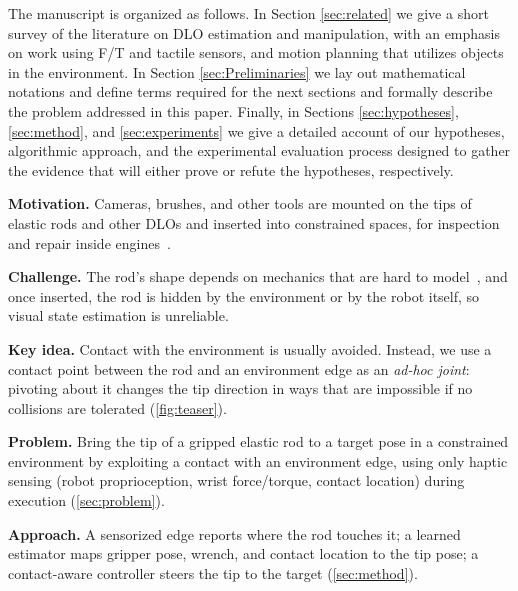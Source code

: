 The manuscript is organized as follows. In Section \ref{sec:related} we give a short survey of the literature on DLO estimation and manipulation, with an emphasis on work using F/T and tactile sensors, and motion planning that utilizes objects in the environment. In Section \ref{sec:Preliminaries} we lay out mathematical notations and define terms required for the next sections and formally describe the problem addressed in this paper. Finally, in Sections \ref{sec:hypotheses}, \ref{sec:method}, and \ref{sec:experiments} we give a detailed account of our hypotheses, algorithmic approach, and the experimental evaluation process designed to gather the evidence that will either prove or refute the hypotheses, respectively. 









\begin{outline}
	
  \item \textbf{Motivation.} Cameras, brushes, and other tools are mounted on
    the tips of elastic rods and other DLOs and inserted into constrained
    spaces, \eg for inspection and repair inside engines~\cite{dong2017slender}.
  \item \textbf{Challenge.} The rod's shape depends on mechanics that are hard
    to model~\cite{sanchez2018survey}, and once inserted, the rod is hidden by
    the environment or by the robot itself, so visual state estimation is
    unreliable.
  \item \textbf{Key idea.} Contact with the environment is usually avoided.
    Instead, we use a contact point between the rod and an environment edge as
    an \emph{ad-hoc joint}: pivoting about it changes the tip direction in ways
    that are impossible if no collisions are tolerated (\cref{fig:teaser}).
  \item \textbf{Problem.} Bring the tip of a gripped elastic rod to a target
    pose in a constrained environment by exploiting a contact with an
    environment edge, using only haptic sensing (robot proprioception, wrist
    force/torque, contact location) during execution (\cref{sec:problem}).
  \item \textbf{Approach.} A sensorized edge reports where the rod touches it;
    a learned estimator maps gripper pose, wrench, and contact location to the
    tip pose; a contact-aware controller steers the tip to the target
    (\cref{sec:method}).
\end{outline}

